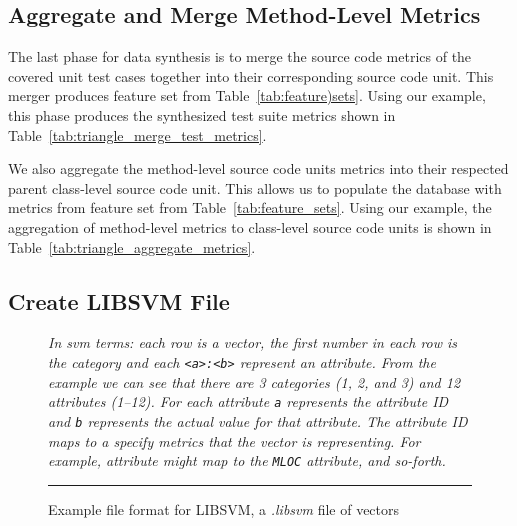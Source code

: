 \subsection{Aggregate and Merge Method-Level Metrics}
\label{subsec:approach_aggregate_merge_metrics}
The last phase for data synthesis is to merge the source code metrics of the covered unit test cases together into their corresponding source code unit. This merger produces feature set  from Table~\ref{tab:feature)sets}. Using our example, this phase produces the synthesized test suite metrics shown in Table~\ref{tab:triangle_merge_test_metrics}.

We also aggregate the method-level source code units metrics into their respected parent class-level source code unit. This allows us to populate the database with metrics from feature set  from Table~\ref{tab:feature_sets}. Using our example, the aggregation of method-level metrics to class-level source code units is shown in Table~\ref{tab:triangle_aggregate_metrics}.


\subsection{Create LIBSVM File}
\label{subsec:approach_create_libsvm_file}
\begin{figure}[!tb]
  \centering
  \begin{minipage}{9.5cm}
    
  \end{minipage}
  \caption{Example file format for LIBSVM, a \emph{.libsvm} file of vectors}
  \vspace{1mm}
  \footnotesize{\emph{In \gls{svm} terms: each row is a vector, the first number in each row is the category and each \texttt{<a>:<b>} represent an attribute. From the example we can see that there are 3 categories (1, 2, and 3) and 12 attributes (1--12). For each attribute \texttt{a} represents the attribute ID and \texttt{b} represents the actual value for that attribute. The attribute ID maps to a specify metrics that the vector is representing. For example, attribute  might map to the \texttt{MLOC} attribute, and so-forth.}}
  \vspace{2mm}
  \hrule
  \label{fig:libsvm_file}
\end{figure}

